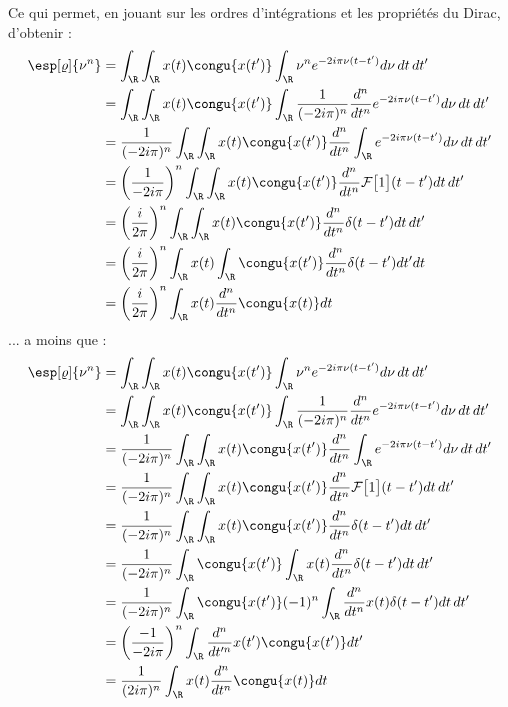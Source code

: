 \begin{demo}
	Ce qui permet, en jouant sur les ordres d'intégrations et les propriétés du Dirac, d'obtenir :
	\begin{align*}
		\esp[\varrho]{\nu^n} &= \int_\R \int_\R x(t) \congu{x(t')} \int_\R \nu^n e^{-2i \pi \nu (t-t')} d\nu\, dt\, dt' \\
		&= \int_\R \int_\R x(t) \congu{x(t')} \int_\R \frac{1}{(-2i \pi)^n}\frac{d^n}{dt^n}e^{-2i \pi \nu(t-t')} d\nu\, dt\, dt' \\
		&= \frac{1}{(-2i \pi)^n} \int_\R \int_\R x(t) \congu{x(t')} \frac{d^n}{dt^n}\int_\R e^{-2i \pi \nu(t-t')} d\nu\, dt\, dt' \\
		&= \left(\frac{1}{-2i \pi}\right)^n \int_\R \int_\R x(t) \congu{x(t')} \frac{d^n}{dt^n}\mathcal{F}\big[1\big](t-t') dt\, dt' \\
		&= \left(\frac{i}{2 \pi}\right)^n \int_\R \int_\R x(t) \congu{x(t')} \frac{d^n}{dt^n}\delta(t-t') dt\, dt' \\
		&= \left(\frac{i}{2 \pi}\right)^n \int_\R x(t) \int_\R \congu{x(t')} \frac{d^n}{dt^n}\delta(t-t') dt' dt \\
		&= \left(\frac{i}{2 \pi}\right)^n  \int_\R x(t) \frac{d^n}{dt^n}  \congu{x(t)} dt
	\end{align*}
	... a moins que :
	\begin{align*}
		\esp[\varrho]{\nu^n} &= \int_\R \int_\R x(t) \congu{x(t')} \int_\R \nu^n e^{-2i \pi \nu (t-t')} d\nu\, dt\, dt' \\
		&= \int_\R \int_\R x(t) \congu{x(t')} \int_\R \frac{1}{(-2i \pi)^n}\frac{d^n}{dt^n}e^{-2i \pi \nu(t-t')} d\nu\, dt\, dt' \\
		&= \frac{1}{(-2i \pi)^n} \int_\R \int_\R x(t) \congu{x(t')} \frac{d^n}{dt^n}\int_\R e^{-2i \pi \nu(t-t')} d\nu\, dt\, dt' \\
		&= \frac{1}{(-2 i\pi)^n} \int_\R \int_\R x(t) \congu{x(t')} \frac{d^n}{dt^n}\mathcal{F}\big[1\big](t-t') dt\, dt' \\
		&= \frac{1}{(-2 i\pi)^n} \int_\R \int_\R x(t) \congu{x(t')} \frac{d^n}{dt^n}\delta(t-t') dt\, dt' \\
		&= \frac{1}{(-2 i\pi)^n} \int_\R \congu{x(t')} \int_\R x(t) \frac{d^n}{dt^n}\delta(t-t') dt\, dt' \\
		&= \frac{1}{(-2 i\pi)^n} \int_\R \congu{x(t')}(-1)^n\int_\R \frac{d^n}{dt^n}x(t) \delta(t-t') dt\, dt' \\
		&= \left(\frac{-1}{-2i \pi}\right)^n \int_\R \frac{d^n}{dt'^n}x(t') \congu{x(t')}  dt' \\
		&= \frac{1}{(2 i\pi)^n}  \int_\R x(t) \frac{d^n}{dt^n}  \congu{x(t)} dt
	\end{align*}
\end{demo}



